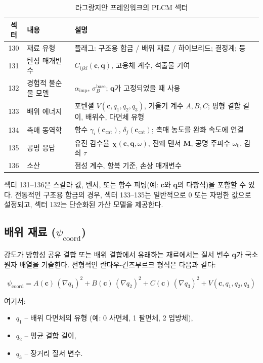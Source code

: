 \documentclass[12pt,a4paper]{article}
\begin{document}
	\begin{table}[htbp]
		\centering
		\caption{라그랑지안 프레임워크의 PLCM 섹터}
		\label{tab:sectors}
		\begin{tabular}{clp{8cm}}
			\toprule
			\textbf{섹터} & \textbf{내용} & \textbf{설명} \\
			\midrule
			130 & 재료 유형 & 플래그: 구조용 합금 / 배위 재료 / 하이브리드; 결정계; 등 \\
			131 & 탄성 매개변수 & \(C_{ijkl}(\mathbf{c}, \mathbf{q})\), 고용체 계수, 석출물 기여 \\
			132 & 경험적 불순물 모델 & \(\alpha_{\mathrm{imp}}\), \(\sigma_B^{\mathrm{base}}\); \(\mathbf{q}\)가 고정되었을 때 사용 \\
			133 & 배위 에너지 & 포텐셜 \(V(\mathbf{c}, q_1,q_2,q_3)\), 기울기 계수 \(A,B,C\); 평형 결합 길이, 배위수, 다면체 유형 \\
			134 & 촉매 동역학 & 함수 \(\gamma_i(\mathbf{c}_{\mathrm{cat}})\), \(\delta_j(\mathbf{c}_{\mathrm{cat}})\); 촉매 농도를 완화 속도에 연결 \\
			135 & 공명 응답 & 유전 감수율 \(\boldsymbol{\chi}(\mathbf{c},\mathbf{q},\omega)\), 전왜 텐서 \(\mathbf{M}\), 공명 주파수 \(\omega_0\), 감쇠 \(\tau\) \\
			136 & 소산 & 점성 계수, 항복 기준, 손상 매개변수 \\
			\bottomrule
		\end{tabular}
	\end{table}
	
	섹터 131–136은 스칼라 값, 텐서, 또는 함수 피팅(예: \(\mathbf{c}\)와 \(\mathbf{q}\)의 다항식)을 포함할 수 있다. 전통적인 구조용 합금의 경우, 섹터 133–135는 일반적으로 0 또는 자명한 값으로 설정되고, 섹터 132는 단순화된 가산 모델을 제공한다.
	
	\subsection{배위 재료 (\(\psi_{\mathrm{coord}}\))}
	\label{subsec:coordination}
	
	강도가 방향성 공유 결합 또는 배위 결합에서 유래하는 재료에서는 질서 변수 \(\mathbf{q}\)가 국소 원자 배열을 기술한다. 전형적인 란다우-긴츠부르크 형식은 다음과 같다:
	
	\[
	\psi_{\mathrm{coord}} = A(\mathbf{c})\,(\nabla q_1)^2 + B(\mathbf{c})\,(\nabla q_2)^2 + C(\mathbf{c})\,(\nabla q_3)^2 + V(\mathbf{c}, q_1, q_2, q_3)
	\]
	
	여기서:
	\begin{itemize}
		\item \(q_1\) – 배위 다면체의 유형 (예: 0 사면체, 1 팔면체, 2 입방체),
		\item \(q_2\) – 평균 결합 길이,
		\item \(q_3\) – 장거리 질서 변수.
	\end{itemize}
	
\end{document}
